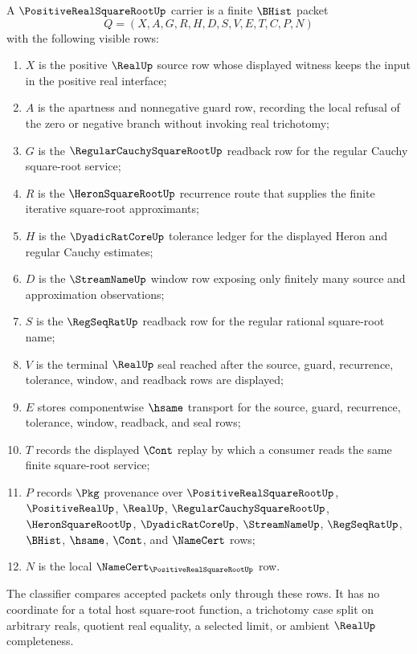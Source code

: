 \begin{definition}
\label{def:positive-real-square-root-carrier}
A $\PositiveRealSquareRootUp$ carrier is a finite $\BHist$ packet
$$
Q=(X,A,G,R,H,D,S,V,E,T,C,P,N)
$$
with the following visible rows:
\begin{enumerate}
\item $X$ is the positive $\RealUp$ source row whose displayed witness keeps the input in the positive real interface;
\item $A$ is the apartness and nonnegative guard row, recording the local refusal of the zero or negative branch without invoking real trichotomy;
\item $G$ is the $\RegularCauchySquareRootUp$ readback row for the regular Cauchy square-root service;
\item $R$ is the $\HeronSquareRootUp$ recurrence route that supplies the finite iterative square-root approximants;
\item $H$ is the $\DyadicRatCoreUp$ tolerance ledger for the displayed Heron and regular Cauchy estimates;
\item $D$ is the $\StreamNameUp$ window row exposing only finitely many source and approximation observations;
\item $S$ is the $\RegSeqRatUp$ readback row for the regular rational square-root name;
\item $V$ is the terminal $\RealUp$ seal reached after the source, guard, recurrence, tolerance, window, and readback rows are displayed;
\item $E$ stores componentwise $\hsame$ transport for the source, guard, recurrence, tolerance, window, readback, and seal rows;
\item $T$ records the displayed $\Cont$ replay by which a consumer reads the same finite square-root service;
\item $P$ records $\Pkg$ provenance over $\PositiveRealSquareRootUp$, $\PositiveRealUp$, $\RealUp$, $\RegularCauchySquareRootUp$, $\HeronSquareRootUp$, $\DyadicRatCoreUp$, $\StreamNameUp$, $\RegSeqRatUp$, $\BHist$, $\hsame$, $\Cont$, and $\NameCert$ rows;
\item $N$ is the local $\NameCert_{\PositiveRealSquareRootUp}$ row.
\end{enumerate}
The classifier compares accepted packets only through these rows. It has no coordinate for a total host square-root function, a trichotomy case split on arbitrary reals, quotient real equality, a selected limit, or ambient $\RealUp$ completeness.
\end{definition}

